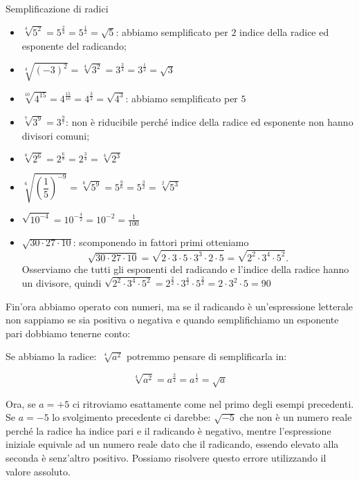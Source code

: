 \begin{exrig}
 \begin{esempio}
Semplificazione di radici
\begin{itemize}
 \item $\sqrt[4]{5^2}=5^{\frac{2}{4}}=5^{\frac{1}{2}}=\sqrt 5$: 
  abbiamo semplificato per $2$ indice della radice ed esponente del radicando;
 \item $\sqrt[4]{(-3)^2}=\sqrt[4]{3^2}=3^{\frac{2}{4}}=3^{\frac{1}{2}}=\sqrt 3$
 \item $\sqrt[10]{4^{15}}=4^{\frac{15}{10}}=4^{\frac{3}{2}}=\sqrt{4^3}$: 
  abbiamo semplificato per $5$
 \item $\sqrt[7]{3^9}=3^{\frac{9}{7}}$: 
  non è riducibile perché indice della radice ed esponente non hanno divisori 
  comuni;
 \item $\sqrt[8]{2^6}=2^{\frac{6}{8}}=2^{\frac{3}{4}}=\sqrt[4]{2^3}$
 \item $\sqrt[6]{\left(\dfrac{1}{5}\right)^{-9}}=\sqrt[6]{5^9}=
        5^{\frac{9}{6}}=5^{\frac{3}{2}}=\sqrt[2]{5^3}$
 \item $\sqrt{10^{-4}}=10^{-\frac{4}{2}}=10^{-2}=\frac 1{100}$
 \item $\sqrt{30\cdot 27\cdot 10}$: scomponendo in fattori primi otteniamo 
  \[\sqrt{30\cdot 27\cdot 10}=
    \sqrt{2\cdot 3\cdot 5\cdot 3^3\cdot 2\cdot 5}=
    \sqrt{2^2\cdot 3^4\cdot 5^2}.\] 
    Osserviamo che tutti gli esponenti del radicando e l'indice della radice 
    hanno un divisore, quindi 
    $\sqrt{2^2\cdot 3^4\cdot 5^2}=
     2^{\frac{2}{2}} \cdot 3^{\frac{4}{2}} \cdot 5^{\frac{2}{2}}=
     2\cdot 3^2\cdot 5=90$
\end{itemize}
\end{esempio}
\end{exrig}

Fin'ora abbiamo operato con numeri, ma se il radicando è un'espressione 
letterale non sappiamo se sia positiva o negativa e quando semplifichiamo un 
esponente pari dobbiamo tenerne conto:

\begin{esempio}
 Se abbiamo la radice:~$\sqrt[4]{a^2}$ potremmo pensare di semplificarla in:
 
 \[\sqrt[4]{a^2}=a^{\frac{2}{4}}=a^{\frac{1}{2}}=\sqrt a\]
 
 Ora, se $a=+5$ ci ritroviamo esattamente come nel primo degli esempi 
 precedenti. Se $a=-5$ lo svolgimento precedente ci darebbe: $\sqrt {-5}$ 
 che non è un numero reale perché la radice ha indice pari e il radicando 
 è negativo, mentre l'espressione iniziale equivale ad un numero reale dato 
 che il radicando, essendo elevato alla seconda è senz'altro positivo.
 Possiamo risolvere questo errore utilizzando il valore assoluto.
\end{esempio}

